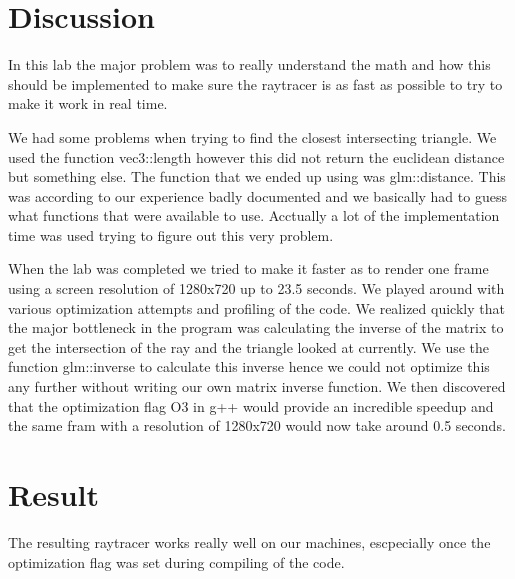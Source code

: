 \documentclass[a4]{article}
\begin{document}
\section{Discussion}
In this lab the major problem was to really understand the math and how this
should be implemented to make sure the raytracer is as fast as possible to try
to make it work in real time.

We had some problems when trying to find the closest intersecting triangle. We
used the function vec3::length however this did not return the euclidean
distance but something else. The function that we ended up using was
glm::distance. This was according to our experience badly documented and we
basically had to guess what functions that were available to use. Acctually a
lot of the implementation time was used trying to figure out this very problem.

When the lab was completed we tried to make it faster as to render one frame
using a screen resolution of 1280x720 up to 23.5 seconds. We played around with
various optimization attempts and profiling of the code. We realized quickly
that the major bottleneck in the program was calculating the inverse of the
matrix to get the intersection of the ray and the triangle looked at currently.
We use the function glm::inverse to calculate this inverse hence we could not
optimize this any further without writing our own matrix inverse function. We
then discovered that the optimization flag O3 in g++ would provide an incredible
speedup and the same fram with a resolution of 1280x720 would now take around 0.5
seconds.

\section{Result}
The resulting raytracer works really well on our machines, escpecially once the
optimization flag was set during compiling of the code. 
\end{document}
